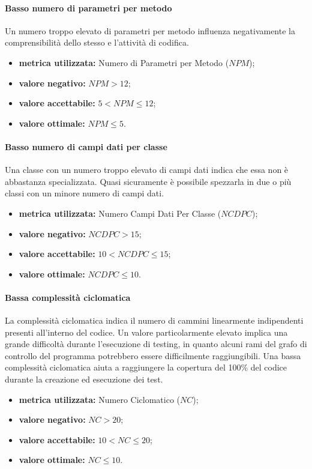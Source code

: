 		\paragraph{Basso numero di parametri per metodo}
			\label{OBNDPPM}
			Un numero troppo elevato di parametri per metodo influenza negativamente la comprensibilità dello stesso e l'attività di codifica. 
			\begin{itemize}
				\item \textbf{metrica utilizzata:} Numero di Parametri per Metodo ($NPM$);
				\item \textbf{valore negativo:} $NPM>12$;
				\item \textbf{valore accettabile:} $5<NPM \leq 12$;
				\item \textbf{valore ottimale:} $NPM\leq5$.
			\end{itemize}

		\paragraph{Basso numero di campi dati per classe}
			\label{OBNDCDPC}
			Una classe con un numero troppo elevato di campi dati indica che essa non è abbastanza specializzata. Quasi sicuramente è possibile spezzarla in due o più classi con un minore numero di campi dati.
			\begin{itemize}
				\item \textbf{metrica utilizzata:} Numero Campi Dati Per Classe ($NCDPC$);
				\item \textbf{valore negativo:} $NCDPC>15$;
				\item \textbf{valore accettabile:} $10<NCDPC \leq 15$;
				\item \textbf{valore ottimale:} $NCDPC\leq10$.
			\end{itemize}
		
		\paragraph{Bassa complessità ciclomatica}
			\label{OBCC}
			La complessità ciclomatica indica il numero di cammini linearmente indipendenti presenti all'interno del codice. Un valore particolarmente elevato implica una grande difficoltà durante l'esecuzione di testing, in quanto alcuni rami del grafo di controllo del programma potrebbero essere difficilmente raggiungibili. Una bassa complessità ciclomatica aiuta a raggiungere la copertura del 100\% del codice durante la creazione ed esecuzione dei test.
			\begin{itemize}
				\item \textbf{metrica utilizzata:} Numero Ciclomatico ($NC$);
				\item \textbf{valore negativo:} $NC>20$;
				\item \textbf{valore accettabile:} $10<NC \leq 20$;
				\item \textbf{valore ottimale:} $NC\leq10$.
			\end{itemize}
		

